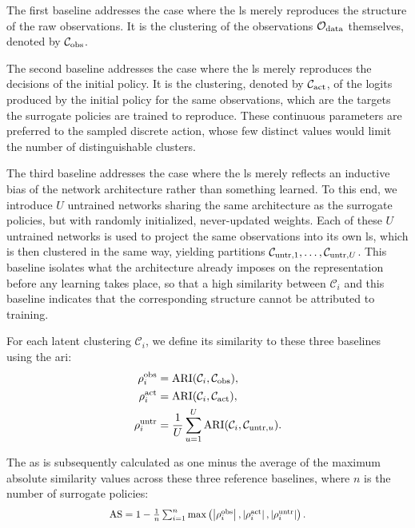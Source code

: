 The first baseline addresses the case where the \gls{ls} merely reproduces the structure of the raw observations.
It is the clustering of the observations $\mathcal{O}_{\mathrm{data}}$ themselves, denoted by $\BaselineClustering{obs}$.

The second baseline addresses the case where the \gls{ls} merely reproduces the decisions of the initial policy.
It is the clustering, denoted by $\BaselineClustering{act}$, of the logits produced by the initial policy for the same observations, which are the targets the surrogate policies are trained to reproduce.
These continuous parameters are preferred to the sampled discrete action, whose few distinct values would limit the number of distinguishable clusters.

The third baseline addresses the case where the \gls{ls} merely reflects an inductive bias of the network architecture rather than something learned.
To this end, we introduce $U$ untrained networks sharing the same architecture as the surrogate policies, but with randomly initialized, never-updated weights.
Each of these $U$ untrained networks is used to project the same observations into its own \gls{ls}, which is then clustered in the same way, yielding partitions $\BaselineClustering[1]{untr}, \dots, \BaselineClustering[U]{untr}$.
This baseline isolates what the architecture already imposes on the representation before any learning takes place, so that a high similarity between $\mathcal{C}_i$ and this baseline indicates that the corresponding structure cannot be attributed to training.

For each latent clustering $\mathcal{C}_{i}$, we define its similarity to these three baselines using the \gls{ari}:
\begin{align*}
\Similarity{obs}{i} &= \ARI(\mathcal{C}_{i}, \BaselineClustering{obs}), \\
\Similarity{act}{i} &= \ARI(\mathcal{C}_{i}, \BaselineClustering{act}), \\
\Similarity{untr}{i} &= \frac{1}{U} \sum_{u=1}^{U} \ARI(\mathcal{C}_{i}, \BaselineClustering[u]{untr}).
\end{align*}

The \gls{as} is subsequently calculated as one minus the average of the maximum absolute similarity values across these three reference baselines, where $n$ is the number of surrogate policies:
\begin{align}
\scalebox{0.9}{%
$\AS = 1 - \frac{1}{n} \sum_{i=1}^{n} \max \left( \left|\Similarity{obs}{i}\right|, \left|\Similarity{act}{i}\right|, \left|\Similarity{untr}{i}\right| \right).$%
}
\end{align}

